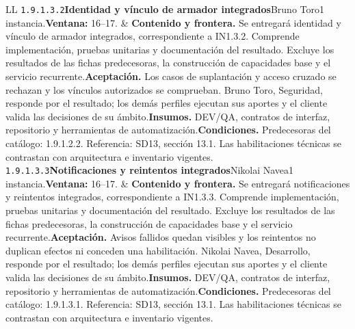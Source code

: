 \begin{longtable}{L{\tabcolsep\relax}L{\tabcolsep\relax}}
\texttt{1.\allowbreak{}9.\allowbreak{}1.\allowbreak{}3.\allowbreak{}2}\newline{}\textbf{Identidad y vínculo de armador integrados}\newline{}Bruno Toro\newline{}1 instancia.\newline{}\textbf{Ventana:} 16--17. & \textbf{Contenido y frontera.} Se entregará identidad y vínculo de armador integrados, correspondiente a IN1.3.2. Comprende implementación, pruebas unitarias y documentación del resultado. Excluye los resultados de las fichas predecesoras, la construcción de capacidades base y el servicio recurrente.\newline{}\textbf{Aceptación.} Los casos de suplantación y acceso cruzado se rechazan y los vínculos autorizados se comprueban. Bruno Toro, Seguridad, responde por el resultado; los demás perfiles ejecutan sus aportes y el cliente valida las decisiones de su ámbito.\newline{}\textbf{Insumos.} DEV/QA, contratos de interfaz, repositorio y herramientas de automatización.\newline{}\textbf{Condiciones.} Predecesoras del catálogo: 1.9.1.2.2. Referencia: SD13, sección 13.1. Las habilitaciones técnicas se contrastan con arquitectura e inventario vigentes.\\\hline
\texttt{1.\allowbreak{}9.\allowbreak{}1.\allowbreak{}3.\allowbreak{}3}\newline{}\textbf{Notificaciones y reintentos integrados}\newline{}Nikolai Navea\newline{}1 instancia.\newline{}\textbf{Ventana:} 16--17. & \textbf{Contenido y frontera.} Se entregará notificaciones y reintentos integrados, correspondiente a IN1.3.3. Comprende implementación, pruebas unitarias y documentación del resultado. Excluye los resultados de las fichas predecesoras, la construcción de capacidades base y el servicio recurrente.\newline{}\textbf{Aceptación.} Avisos fallidos quedan visibles y los reintentos no duplican efectos ni conceden una habilitación. Nikolai Navea, Desarrollo, responde por el resultado; los demás perfiles ejecutan sus aportes y el cliente valida las decisiones de su ámbito.\newline{}\textbf{Insumos.} DEV/QA, contratos de interfaz, repositorio y herramientas de automatización.\newline{}\textbf{Condiciones.} Predecesoras del catálogo: 1.9.1.3.1. Referencia: SD13, sección 13.1. Las habilitaciones técnicas se contrastan con arquitectura e inventario vigentes.\\\hline

\end{longtable}
